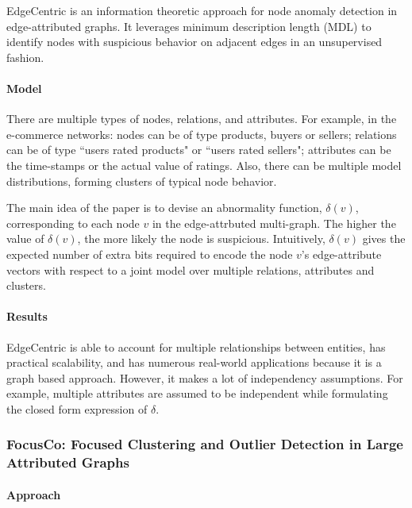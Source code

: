 \documentclass[11pt, oneside]{article}   	%
\begin{document}
\quad EdgeCentric \cite{edgecentric} is an information theoretic approach for node anomaly detection in edge-attributed graphs.%
It leverages minimum description length (MDL) to identify nodes with suspicious behavior on adjacent edges in an unsupervised fashion. 

\paragraph{Model}
\quad

\quad There are multiple types of nodes, relations, and attributes.
For example, in the e-commerce networks: nodes can be of type products, buyers or sellers; relations can be of type ``users rated products" or ``users rated sellers"; attributes can be the time-stamps or the actual value of ratings.
Also, there can be multiple model distributions, forming clusters of typical node behavior.

\quad The main idea of the paper is to devise an abnormality function, $\delta(v)$, corresponding to each node $v$ in the edge-attrbuted multi-graph.
The higher the value of $\delta(v)$, the more likely the node is suspicious.
Intuitively, $\delta(v)$ gives the expected number of extra bits required to encode the node $v$’s edge-attribute vectors with respect to a joint model over multiple relations, attributes and clusters.

\paragraph{Results}
\quad

\quad EdgeCentric is able to account for multiple relationships between entities, has practical scalability, and has numerous real-world applications because it is a graph based approach.
However, it makes a lot of independency assumptions.
For example, multiple attributes are assumed to be independent while formulating the closed form expression of $\delta$. 


\subsubsection{FocusCo: Focused Clustering and Outlier Detection in Large Attributed Graphs }

\paragraph{Approach}
\quad
\end{document}
